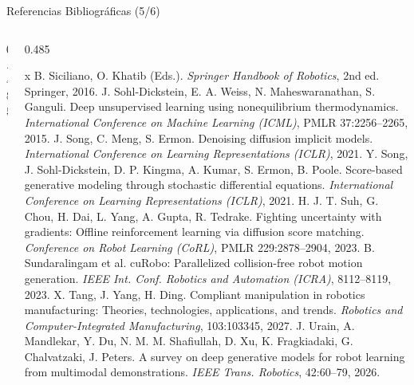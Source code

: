 \documentclass[aspectratio=169,10pt,xcolor={dvipsnames,table}]{beamer}
\begin{document}
\begin{frame}{Referencias Bibliográficas (5/6)}
\begin{columns}[T, onlytextwidth]
\begin{column}{0.485\textwidth}
    \end{column}
    \begin{column}{0.485\textwidth}
      \RefsFont
      \begin{thebibliography}{x}\setlength{\itemsep}{0.8pt}
         B. Siciliano, O. Khatib (Eds.). \newblock \emph{Springer Handbook of Robotics}, 2nd ed. \newblock Springer, 2016.
         J. Sohl-Dickstein, E. A. Weiss, N. Maheswaranathan, S. Ganguli. \newblock Deep unsupervised learning using nonequilibrium thermodynamics. \newblock \emph{International Conference on Machine Learning (ICML)}, PMLR 37:2256--2265, 2015.
         J. Song, C. Meng, S. Ermon. \newblock Denoising diffusion implicit models. \newblock \emph{International Conference on Learning Representations (ICLR)}, 2021.
         Y. Song, J. Sohl-Dickstein, D. P. Kingma, A. Kumar, S. Ermon, B. Poole. \newblock Score-based generative modeling through stochastic differential equations. \newblock \emph{International Conference on Learning Representations (ICLR)}, 2021.
         H. J. T. Suh, G. Chou, H. Dai, L. Yang, A. Gupta, R. Tedrake. \newblock Fighting uncertainty with gradients: Offline reinforcement learning via diffusion score matching. \newblock \emph{Conference on Robot Learning (CoRL)}, PMLR 229:2878--2904, 2023.
         B. Sundaralingam et al. \newblock cuRobo: Parallelized collision-free robot motion generation. \newblock \emph{IEEE Int. Conf. Robotics and Automation (ICRA)}, 8112--8119, 2023.
         X. Tang, J. Yang, H. Ding. \newblock Compliant manipulation in robotics manufacturing: Theories, technologies, applications, and trends. \newblock \emph{Robotics and Computer-Integrated Manufacturing}, 103:103345, 2027.
         J. Urain, A. Mandlekar, Y. Du, N. M. M. Shafiullah, D. Xu, K. Fragkiadaki, G. Chalvatzaki, J. Peters. \newblock A survey on deep generative models for robot learning from multimodal demonstrations. \newblock \emph{IEEE Trans. Robotics}, 42:60--79, 2026.
      \end{thebibliography}
    \end{column}
  \end{columns}
\end{frame}
\end{document}
